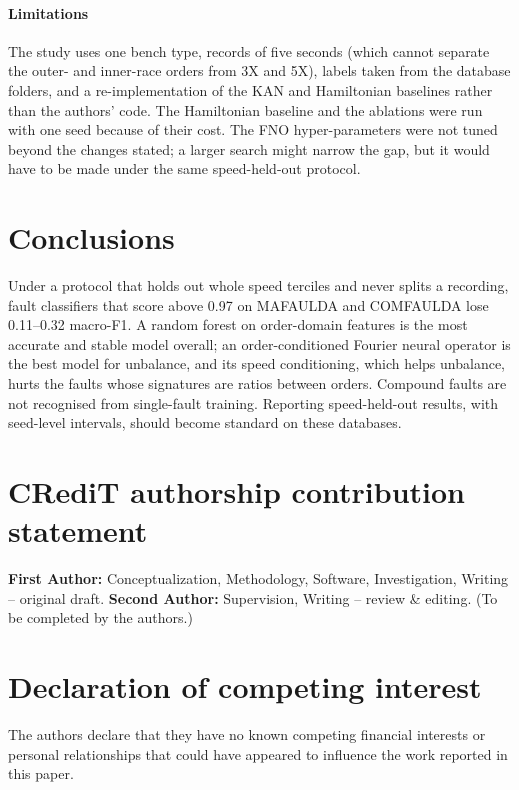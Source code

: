 \documentclass[preprint,review,12pt,authoryear=false]{elsarticle}
\begin{document}
\paragraph{Limitations} The study uses one bench type, records of five seconds (which cannot separate the outer- and
inner-race orders from 3X and 5X), labels taken from the database folders, and a re-implementation of the KAN and
Hamiltonian baselines rather than the authors' code. The Hamiltonian baseline and the ablations were run with one seed
because of their cost. The FNO hyper-parameters were not tuned beyond the changes stated; a larger search might narrow
the gap, but it would have to be made under the same speed-held-out protocol.

\section{Conclusions}
\label{sec:conclusions}

Under a protocol that holds out whole speed terciles and never splits a recording, fault classifiers that score above
0.97 on MAFAULDA and COMFAULDA lose 0.11--0.32 macro-F1. A random forest on order-domain features is the most accurate
and stable model overall; an order-conditioned Fourier neural operator is the best model for unbalance, and its speed
conditioning, which helps unbalance, hurts the faults whose signatures are ratios between orders. Compound faults are
not recognised from single-fault training. Reporting speed-held-out results, with seed-level intervals, should become
standard on these databases.

\section*{CRediT authorship contribution statement}
\textbf{First Author:} Conceptualization, Methodology, Software, Investigation, Writing -- original draft.
\textbf{Second Author:} Supervision, Writing -- review \& editing. (To be completed by the authors.)

\section*{Declaration of competing interest}
The authors declare that they have no known competing financial interests or personal relationships that could have
appeared to influence the work reported in this paper.
\end{document}
